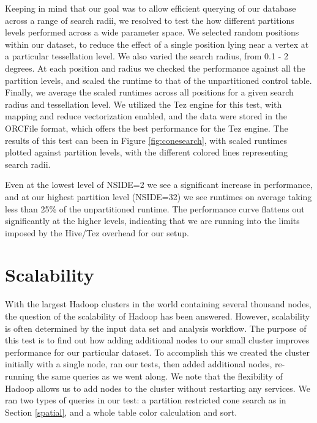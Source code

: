 \documentclass[11pt,twoside]{article}
\begin{document}
Keeping in mind that our goal was to allow efficient querying of our database across a range of search radii,
we resolved to test the how different partitions levels performed across a wide parameter space.  We selected
random positions within our dataset, to reduce the effect of a single position lying near a vertex at a
particular tessellation level.  We also varied the search radius, from 0.1 - 2 degrees.  At each position and
radius we checked the performance against all the partition levels, and scaled the runtime to that of the
unpartitioned control table.  Finally, we average the scaled runtimes across all positions for a given search
radius and tessellation level.  We utilized the Tez engine for this test, with mapping and reduce
vectorization enabled, and the data were stored in the ORCFile format, which offers the best performance for
the Tez engine.  The results of this test can been in Figure \ref{fig:conesearch}, with scaled runtimes
plotted against partition levels, with the different colored lines representing search radii.


Even at the lowest level of NSIDE=2 we see a significant increase in performance, and at our highest partition
level (NSIDE=32) we see runtimes on average taking less than 25\% of the unpartitioned runtime.  The
performance curve flattens out significantly at the higher levels, indicating that we are running into the
limits imposed by the Hive/Tez overhead for our setup.


\section{Scalability}
With the largest Hadoop clusters in the world containing several thousand nodes, the question of the
scalability of Hadoop has been answered. However, scalability is often determined by the input data set and
analysis workflow. The purpose of this test is to find out how adding additional nodes to our small cluster
improves performance for our particular dataset.  To accomplish this we created the cluster initially with a
single node, ran our tests, then added additional nodes, re-running the same queries as we went along.  We
note that the flexibility of Hadoop allows us to add nodes to the cluster without restarting any services.  We
ran two types of queries in our test: a partition restricted cone search as in Section \ref{spatial}, and a
whole table color calculation and sort.
\end{document}
